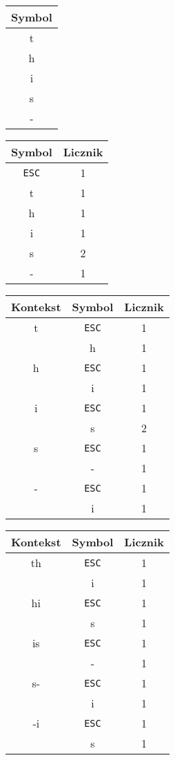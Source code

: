 \documentclass{../notatki}
\begin{document}
\begin{table*}[h]
  \centering
  \begin{tabular}{|c|}
    \hline
    Symbol \\ \hline
    t \\ \hline
    h \\ \hline
    i \\ \hline
    s \\ \hline
    - \\ \hline

  \end{tabular}
  \begin{tabular}{c|c}
    Symbol & Licznik \\ \hline
    \texttt{ESC} & 1 \\ \hline
    t & 1 \\ \hline
    h & 1 \\ \hline
    i & 1 \\ \hline
    s & 2 \\ \hline
    - & 1 \\
  \end{tabular}
  \begin{tabular}{c|c|c}
    Kontekst & Symbol & Licznik \\
    \hline
    t & \texttt{ESC} & 1 \\
    & h & 1 \\
    \hline
    h & \texttt{ESC} & 1 \\
    & i & 1 \\
    \hline
    i & \texttt{ESC} & 1 \\
    & s & 2 \\
    \hline
    s & \texttt{ESC} & 1 \\
    & - & 1 \\
    \hline
    - & \texttt{ESC} & 1 \\
    & i & 1 \\
  \end{tabular}
  \begin{tabular}{c|c|c}
    Kontekst & Symbol & Licznik \\
    \hline
    th & \texttt{ESC} & 1 \\
    & i & 1 \\
    \hline
    hi & \texttt{ESC} & 1 \\
    & s & 1 \\
    \hline
    is & \texttt{ESC} & 1 \\
    & - & 1 \\
    \hline
    s- & \texttt{ESC} & 1 \\
    & i & 1 \\
    \hline
    -i & \texttt{ESC} & 1 \\
    & s & 1 \\
  \end{tabular}
  \caption{Przykład drzew kontekstowych z maksymalną długością $2$
  dla słowa "this-is"}
\end{table*}
\end{document}
